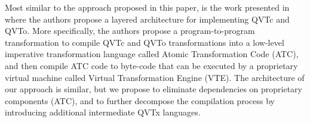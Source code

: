 Most similar to the approach proposed in this paper, is the work presented in \cite{Sanchez-Barbudo.etal2008} where the authors propose a layered architecture for implementing QVTc and QVTo. More specifically, the authors propose a program-to-program transformation to compile QVTc and QVTo transformations into a low-level imperative transformation language called Atomic Transformation Code (ATC), and then compile ATC code to byte-code that can be executed by a proprietary virtual machine called Virtual Transformation Engine (VTE). The architecture of our approach is similar, but we propose to eliminate dependencies on proprietary components (ATC), and to further decompose the compilation process by introducing additional intermediate QVTx languages.

